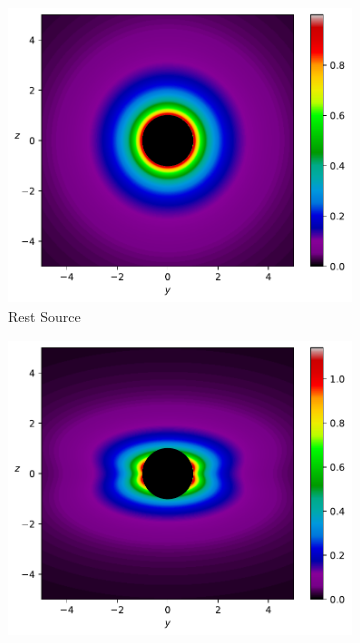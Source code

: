 \begin{figure}[H]
	\centering
	\begin{subfigure}{0.45\textwidth}
		\centering
		\includegraphics[width=\textwidth]{images/pdf/Density_of_Light_from_Rest_Source.pdf}
		\caption{Rest Source}
		\label{subfig_1: light emitted from a source's rate of change of vector density norm}
	\end{subfigure}
	\begin{subfigure}{0.45\textwidth}
		\centering
		\includegraphics[width=\textwidth]{images/pdf/Rate_of_Change_of_Vector_Density_norm_of_Light_from_Moving_Source.pdf}

\end{subfigure}
\end{figure}
